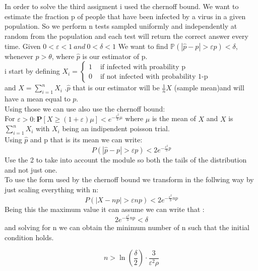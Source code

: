 \documentclass{article}
\begin{document}
\section{}
In order to solve the third assigment i used the chernoff bound.
We want to estimate the fraction p of people that have been infected by a virus in a given population.
So we perform n tests sampled uniformly and independently at random from the population and each test will return the correct answer every time.
Given $0<\varepsilon<1   \ and  \ 0<\delta<1$ We want to find $\mathbb{P}(|\hat{p}-p|>\varepsilon p)<\delta$, whenever $p>\theta$,
where $\hat{p}$ is our estimator of p.\\
i start by defining \( X_{i}=\left\{\begin{array}{ll}1 & \text { if \ infected \ with \ proability \ p} \\ 0 & \text { if\ not \ infected \ with \ probability \ 1-p }\end{array}\right. \)
\\and $X=\sum ^{n}_{i=1}X_{i}$ .$\hat{p}$ that is our estimator will be \( \frac{1}{n} X \) (sample mean)and will have a mean equal to $p$.\\Using those we can use also use the chernoff bound:\\For $\varepsilon>0: \mathbf{P}[X \geq(1+\varepsilon) \mu]<e^{-\frac{\varepsilon^2}{3} \mu}$ where $\mu$ is the mean of $X$ and $X$ is $\sum ^{n}_{i=1}X_{i}$ with $X_{i}$ being an indipendent poisson trial.\\
Using $\hat{p}$ and p that is its mean we can write:\\
$$
P(|\hat{p}-p|>\varepsilon p)<2e^{-\frac{\varepsilon^2}{3} p}
$$
Use the 2 to take into account the module so both the tails of the distribution and not just one.\\
To use the form used by the chernoff bound we transform in the follwing way by just scaling everything with n:\\
$$
P(|X-np|>\varepsilon n p)<2e^{-\frac{\varepsilon^2}{3} np}
$$
Being this the maximum value it can assume we can write that :
$$2e^{-\frac{\varepsilon^2}{3} np}<\delta$$ and solving for n we can obtain the minimum number of n such that the initial condition holds.

$$
n>\ln \left(\frac{\delta}{2}\right) \cdot \frac{3}{\varepsilon^2 \rho}
$$
\end{document}
